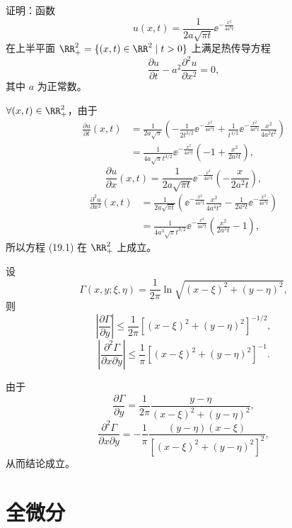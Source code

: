 \begin{xexample}[19.1.2]
证明：函数
\[
  u(x,t)=\frac{1}{2a\sqrt{\pi t}}\ee^{-\frac{x^2}{4a^2t}}
\]
在上半平面 $\RR^2_+=\{(x,t)\in\RR^2\mid t>0\}$ 上满足热传导方程
\begin{equation}
  \frac{\partial u}{\partial t}-a^2\frac{\partial^2u}{\partial x^2}=0,
  \tag{19.1}
  \label{eq:19.1}
\end{equation}
其中 $a$ 为正常数。
\end{xexample}
\begin{xproof}
$\forall (x,t)\in\RR^2_+$，由于
\begin{align*}
  \frac{\partial u}{\partial t}(x,t)
  &=\frac{1}{2a\sqrt\pi}\left(-\frac{1}{2t^{3/2}}\ee^{-\frac{x^2}{4a^2t}}
    +\frac{1}{t^{1/2}}\ee^{-\frac{x^2}{4a^2t}}\frac{x^2}{4a^2t^2}\right)\\
  &=\frac{1}{4a\sqrt\pi t^{3/2}}\ee^{-\frac{x^2}{4a^2t}}
    \left(-1+\frac{x^2}{2a^2t}\right),
\end{align*}
\[
  \frac{\partial u}{\partial x}(x,t)
  =\frac{1}{2a\sqrt{\pi t}}\ee^{-\frac{x^2}{4a^2t}}
    \left(-\frac{x}{2a^2t}\right),
\]
\begin{align*}
  \frac{\partial^2u}{\partial x^2}(x,t)
  &=\frac{1}{2a\sqrt{\pi t}}
    \left(\ee^{-\frac{x^2}{4a^2t}}\frac{x^2}{4a^4t^2}
      -\frac{1}{2a^2t}\ee^{-\frac{x^2}{4a^2t}}\right)\\
  &=\frac{1}{4a^3\sqrt\pi t^{3/2}}\ee^{-\frac{x^2}{4a^2t}}
    \left(\frac{x^2}{2a^2t}-1\right),
\end{align*}
所以方程 (19.1) 在 $\RR^2_+$ 上成立。
\end{xproof}

\begin{xexample}[19.1.3]
设
\[
  \Gamma(x,y;\xi,\eta)=\frac{1}{2\pi}\ln\sqrt{(x-\xi)^2+(y-\eta)^2},
\]
则
\[
  \left|\frac{\partial\Gamma}{\partial y}\right|
  \le \frac{1}{2\pi}[(x-\xi)^2+(y-\eta)^2]^{-1/2},
\]
\[
  \left|\frac{\partial^2\Gamma}{\partial x\partial y}\right|
  \le \frac{1}{\pi}[(x-\xi)^2+(y-\eta)^2]^{-1}.
\]
\end{xexample}
\begin{xproof}
由于
\[
  \frac{\partial\Gamma}{\partial y}
  =\frac{1}{2\pi}\frac{y-\eta}{(x-\xi)^2+(y-\eta)^2},
\]
\[
  \frac{\partial^2\Gamma}{\partial x\partial y}
  =-\frac{1}{\pi}\frac{(y-\eta)(x-\xi)}{[(x-\xi)^2+(y-\eta)^2]^2},
\]
从而结论成立。
\end{xproof}

\section{全微分}

